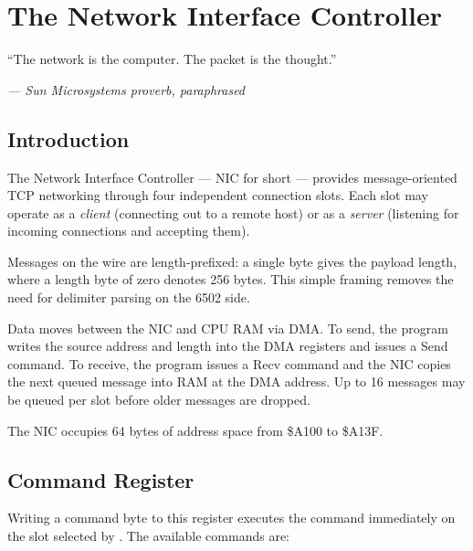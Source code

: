 \chapter{The Network Interface Controller}

\epigraph{``The network is the computer.  The packet is the thought.''}%
         {\textit{--- Sun Microsystems proverb, paraphrased}}

\section*{Introduction}

The Network Interface Controller --- NIC for short --- provides message-oriented
TCP networking through four independent connection slots.  Each slot may operate
as a \emph{client} (connecting out to a remote host) or as a \emph{server}
(listening for incoming connections and accepting them).

Messages on the wire are length-prefixed: a single byte gives the payload
length, where a length byte of zero denotes 256 bytes.  This simple framing
removes the need for delimiter parsing on the 6502 side.

Data moves between the NIC and CPU RAM via DMA.  To send, the program writes
the source address and length into the DMA registers and issues a Send command.
To receive, the program issues a Recv command and the NIC copies the next
queued message into RAM at the DMA address.  Up to 16 messages may be queued
per slot before older messages are dropped.

The NIC occupies 64 bytes of address space from \$A100 to \$A13F.


\section{Command Register}
\label{sec:nic-cmd}


Writing a command byte to this register executes the command immediately on the
slot selected by .  The available commands are:


